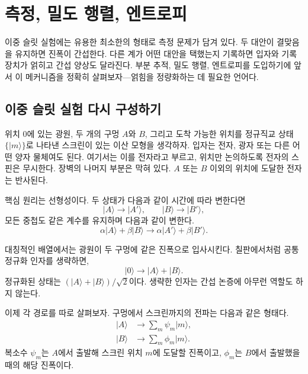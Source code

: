 \chapter{측정, 밀도 행렬, 엔트로피}

이중 슬릿 실험에는 유용한 최소한의 형태로 측정 문제가 담겨 있다. 두 대안이 결맞음을 유지하면 진폭이 간섭한다. 다른 계가 어떤 대안을 택했는지 기록하면 입자와 기록 장치가 얽히고 간섭 양상도 달라진다. 부분 추적, 밀도 행렬, 엔트로피를 도입하기에 앞서 이 메커니즘을 정확히 살펴보자---얽힘을 정량화하는 데 필요한 언어다.

\section{이중 슬릿 실험 다시 구성하기}

위치 \(0\)에 있는 광원, 두 개의 구멍 \(A\)와 \(B\), 그리고 도착 가능한 위치를 정규직교 상태 \(\{|m\rangle\}\)로 나타낸 스크린이 있는 이산 모형을 생각하자. 입자는 전자, 광자 또는 다른 어떤 양자 물체여도 된다. 여기서는 이를 전자라고 부르고, 위치만 논의하도록 전자의 스핀은 무시한다. 장벽의 나머지 부분은 막혀 있다. \(A\) 또는 \(B\) 이외의 위치에 도달한 전자는 반사된다.

핵심 원리는 선형성이다. 두 상태가 다음과 같이 시간에 따라 변한다면
\begin{equation}
|A\rangle\longrightarrow |A'\rangle,
\qquad
|B\rangle\longrightarrow |B'\rangle,
\end{equation}
모든 중첩도 같은 계수를 유지하며 다음과 같이 변한다.
\begin{equation}
\alpha|A\rangle+\beta|B\rangle
\longrightarrow
\alpha|A'\rangle+\beta|B'\rangle.
\end{equation}

대칭적인 배열에서는 광원이 두 구멍에 같은 진폭으로 입사시킨다. 칠판에서처럼 공통 정규화 인자를 생략하면,
\begin{equation}
|0\rangle\longrightarrow |A\rangle+|B\rangle.
\end{equation}
정규화된 상태는 \((|A\rangle+|B\rangle)/\sqrt{2}\)이다. 생략한 인자는 간섭 논증에 아무런 역할도 하지 않는다.

이제 각 경로를 따로 살펴보자. 구멍에서 스크린까지의 전파는 다음과 같은 형태다.
\begin{align}
|A\rangle &\longrightarrow \sum_m \psi_m|m\rangle, \\
|B\rangle &\longrightarrow \sum_m \phi_m|m\rangle.
\end{align}
복소수 \(\psi_m\)는 \(A\)에서 출발해 스크린 위치 \(m\)에 도달할 진폭이고, \(\phi_m\)는 \(B\)에서 출발했을 때의 해당 진폭이다.


